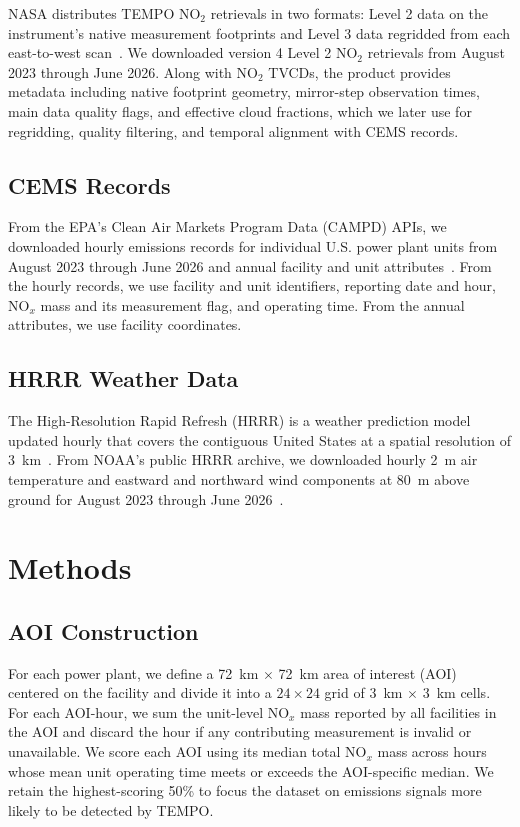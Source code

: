 \documentclass[sigconf,nonacm]{acmart}
\newcommand{\NOx}{NO$_x$}
\begin{document}
NASA distributes TEMPO NO$_2$ retrievals in two formats: Level 2 data on the
instrument's native measurement footprints and Level 3 data regridded from each
east-to-west scan~\cite{tempo2026userGuide}. We downloaded version 4 Level 2
NO$_2$ retrievals from August 2023 through June 2026. Along with NO$_2$
TVCDs, the product provides metadata including native footprint geometry,
mirror-step observation times, main data quality flags, and effective cloud
fractions, which we later use for regridding, quality filtering, and temporal
alignment with CEMS records.

\subsection{CEMS Records}

From the EPA's Clean Air Markets Program Data (CAMPD) APIs, we downloaded hourly
emissions records for individual U.S. power plant units from August 2023 through
June 2026 and annual facility and unit attributes~\cite{epa2026powerSectorData}.
From the hourly records, we use facility and unit identifiers,
reporting date and hour, \NOx{} mass and its measurement flag, and operating time.
From the annual attributes, we use facility coordinates.

\subsection{HRRR Weather Data}

The High-Resolution Rapid Refresh (HRRR) is a weather prediction model updated
hourly that covers the contiguous United States at a spatial resolution of
3~km~\cite{noaa2026hrrrDocumentation}. From NOAA's public HRRR archive,
we downloaded hourly 2~m air temperature and eastward and northward
wind components at 80~m above ground for August 2023 through
June 2026~\cite{noaa2026hrrrArchive}.

\section{Methods}

\subsection{AOI Construction}

For each power plant, we define a 72~km $\times$ 72~km area of interest (AOI)
centered on the facility and divide it into a $24 \times 24$ grid of
3~km $\times$ 3~km cells. For each AOI-hour, we sum the unit-level \NOx{} mass
reported by all facilities in the AOI and discard the hour if any contributing
measurement is invalid or unavailable. We score each AOI using its median total
\NOx{} mass across hours whose mean unit operating time meets or exceeds the
AOI-specific median. We retain the highest-scoring 50\% to focus the dataset on
emissions signals more likely to be detected by TEMPO.
\end{document}
